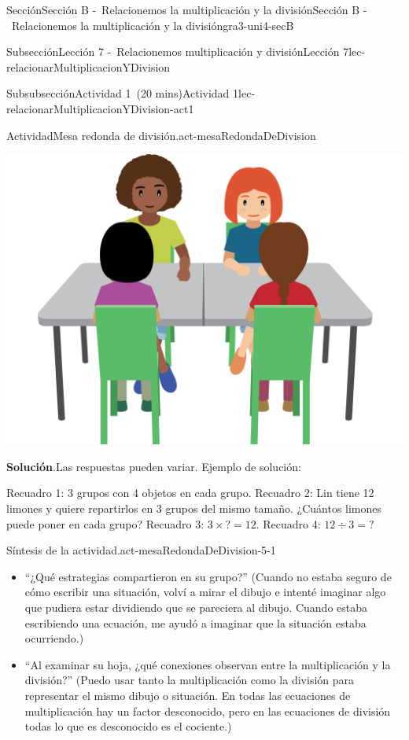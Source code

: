 \documentclass[oneside,10pt,]{article}
\newcommand{\blocktitlefont}{\relax}
\begin{document}
\begin{sectionptx}{Sección}{Sección B -~Relacionemos la multiplicación y la división}{}{Sección B -~Relacionemos la multiplicación y la división}{}{}{gra3-uni4-secB}
\begin{subsectionptx}{Subsección}{Lección 7 -~Relacionemos multiplicación y división}{}{Lección 7}{}{}{lec-relacionarMultiplicacionYDivision}
\begin{subsubsectionptx}{Subsubsección}{Actividad 1~(20 mins)}{}{Actividad 1}{}{}{lec-relacionarMultiplicacionYDivision-act1}
\begin{activity}{Actividad}{Mesa redonda de división.}{act-mesaRedondaDeDivision}
\begin{image}{0.2}{0.6}{0.2}{}
\includegraphics[width=\linewidth]{external/png-source/CS 3.4 Lesson 7 Activity 1.png}
\end{image}%
\par\smallskip%
\noindent\textbf{\blocktitlefont Solución}.\hypertarget{act-mesaRedondaDeDivision-3}{}\quad{}Las respuestas pueden variar. Ejemplo de solución:%
\par
Recuadro 1: 3 grupos con 4 objetos en cada grupo. Recuadro 2: Lin tiene 12 limones y quiere repartirlos en 3 grupos del mismo tamaño. ¿Cuántos limones puede poner en cada grupo? Recuadro 3: \(3 \times {?} = 12\). Recuadro 4: \(12 \div 3 = {?} \)%
\end{activity}%
%
\par
\begin{paragraphs}{Síntesis de la actividad.}{act-mesaRedondaDeDivision-5-1}%
%
\begin{itemize}[label=\textbullet]
\item{}``¿Qué estrategias compartieron en su grupo?'' (Cuando no estaba seguro de cómo escribir una situación, volví a mirar el dibujo e intenté imaginar algo que pudiera estar dividiendo que se pareciera al dibujo. Cuando estaba escribiendo una ecuación, me ayudó a imaginar que la situación estaba ocurriendo.)%
\item{}``Al examinar su hoja, ¿qué conexiones observan entre la multiplicación y la división?'' (Puedo usar tanto la multiplicación como la división para representar el mismo dibujo o situación. En todas las ecuaciones de multiplicación hay un factor desconocido, pero en las ecuaciones de división todas lo que es desconocido es el cociente.)%

\end{itemize}
\end{paragraphs}
\end{subsubsectionptx}
\end{subsectionptx}
\end{sectionptx}
\end{document}
